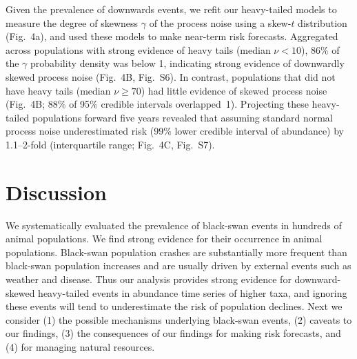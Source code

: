 \documentclass[9pt,twocolumn,twoside]{pnas-new}
\newcommand{\figskewnu}{{6}}
\newcommand{\figskewprojections}{{7}}
\newcommand{\crashUnderRange}{1.1--2}
\newcommand{\probDensSkewedForHeavyPops}{86}
\newcommand{\percNormPopsNotSkewed}{88}
\begin{document}
Given the prevalence of downwards events, we refit our heavy-tailed models to
measure the degree of skewness \(\gamma\) of the process noise using a skew-$t$
distribution (Fig.~4a), and used these models to make near-term risk forecasts.
Aggregated across populations with strong evidence of heavy tails (median \(\nu
< 10\)), \probDensSkewedForHeavyPops\% of the \(\gamma\)
probability density was below 1, indicating
strong evidence of downwardly skewed process noise (Fig.~4B,
Fig.~S\figskewnu). In contrast, populations that did not have heavy
tails (median \(\nu \geq 70\)) had little evidence of skewed process noise
(Fig.~4B; \percNormPopsNotSkewed\% of 95\% credible intervals overlapped~1). Projecting these
heavy-tailed populations forward five years revealed that assuming standard
normal process noise underestimated risk (99\% lower credible interval of
abundance) by \crashUnderRange-fold (interquartile range; Fig.~4C,
Fig.~S\figskewprojections).

\section*{Discussion}

We systematically evaluated the prevalence of black-swan events in hundreds of
animal populations.
We find strong evidence for their occurrence in animal populations. Black-swan
population crashes are substantially more frequent
than black-swan population
increases and are usually driven by external events such as weather and
disease.
Thus our analysis provides strong evidence
for downward-skewed heavy-tailed events in abundance time series of higher
taxa, and ignoring these events will tend to underestimate the risk of
population declines.
Next we consider
(1) the possible mechanisms underlying black-swan events,
(2) caveats to our findings,
(3) the consequences of our findings for making risk forecasts, and
(4) for managing natural resources.
\end{document}
